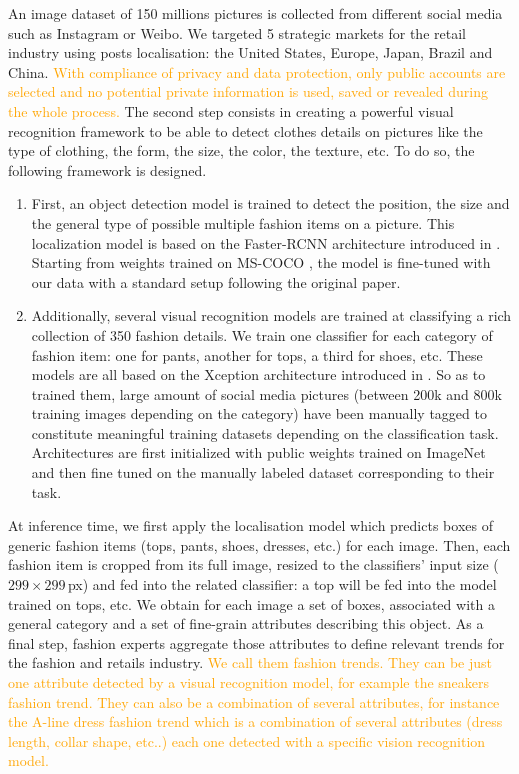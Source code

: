 \documentclass[10pt]{article} %
\begin{document}
An image dataset of 150 millions pictures is collected from different social media such as Instagram or Weibo. We targeted 5 strategic markets for the retail industry using posts localisation: the United States, Europe, Japan, Brazil and China. \textcolor{orange}{With compliance of privacy and data protection, only public accounts are selected and no potential private information is used, saved or revealed during the whole process.}
The second step consists in creating a powerful visual recognition framework to be able to detect clothes details on pictures like the type of clothing, the form, the size, the color, the texture, etc. To do so, the following framework is designed.
\begin{enumerate}
    \item First, an object detection model is trained to detect the position, the size and the general type of possible multiple fashion items on a picture. This localization model is based on the Faster-RCNN architecture introduced in \citet{ren2015}. Starting from weights trained on MS-COCO \citep{lin2014}, the model is fine-tuned with our data with a standard setup following the original paper.
    \item  Additionally, several visual recognition models are trained at classifying a rich collection of 350 fashion details. We train one classifier for each category of fashion item: one for pants, another for tops, a third for shoes, etc. These models are all based on the Xception architecture introduced in \citet{chollet2017}. So as to trained them, large amount of social media pictures (between 200k and 800k training images depending on the category) have been manually tagged to constitute meaningful training datasets depending on the classification task. Architectures are first initialized with public weights trained on ImageNet \citep{russakovsky2014} and then fine tuned on the manually labeled dataset corresponding to their task.
\end{enumerate}

At inference time, we first apply the localisation model which predicts boxes of generic fashion items (tops, pants, shoes, dresses, etc.) for each image. Then, each fashion item is cropped from its full image, resized to the classifiers' input size ($299\times299\,$px) and fed into the related classifier: a top will be fed into the model trained on tops, etc. We obtain for each image a set of boxes, associated with a general category and a set of fine-grain attributes describing this object. As a final step, fashion experts aggregate those attributes to define relevant trends for the fashion and retails industry. \textcolor{orange}{We call them fashion trends. They can be just one attribute detected by a visual recognition model, for example the sneakers fashion trend. They can also be a combination of several attributes, for instance the A-line dress fashion trend which is a combination of several attributes (dress length, collar shape, etc..) each one detected with a specific vision recognition model.}
\end{document}
